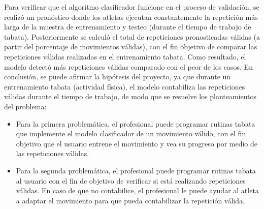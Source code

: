 \medbreak
Para verificar que el algoritmo clasificador funcione en el proceso de validaci\'on, se realiz\'o un pron\'ostico donde los atletas ejecutan constantemente la repetici\'on m\'as larga de la muestra de entrenamiento y testeo (durante el tiempo de trabajo de tabata). Posteriormente se calcul\'o el total de repeticiones pronosticadas v\'alidas (a partir del porcentaje de movimientos v\'alidas), con el fin objetivo de comparar las repeticiones v\'alidas realizadas en el entrenamiento tabata. Como resultado, el modelo detect\'o m\'as repeticiones v\'alidas comparado con el peor de los casos.
\medbreak
En conclusi\'on, se puede afirmar la hip\'otesis del proyecto, ya que durante un entrenamiento tabata (actividad f\'isica), el modelo contabiliza las repeticiones v\'alidas durante el tiempo de trabajo, de modo que se resuelve los planteamientos  del problema:
\begin{itemize}
\item	Para la primera problem\'atica, el profesional puede programar rutinas tabata que implemente el modelo clasificador de un movimiento v\'alido, con el fin objetivo que el usuario entrene el movimiento y vea su progreso por medio de las repeticiones v\'alidas.
\item	Para la segunda problem\'atica, el profesional puede programar rutinas tabata al usuario con el fin de objetivo de verificar si est\'a realizando repeticiones v\'alidas. En caso de que no contabilice, el profesional le puede ayudar al atleta a adaptar el movimiento para que pueda contabilizar la repetici\'on v\'alida.
\end{itemize}
